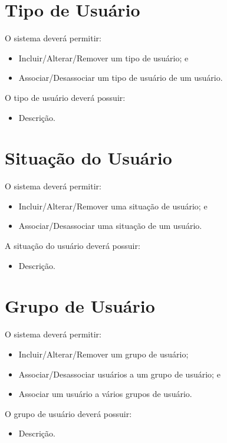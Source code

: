 \section{Tipo de Usuário}

O sistema deverá permitir:

\begin{itemize}
	\item Incluir/Alterar/Remover um tipo de usuário; e
	\item Associar/Desassociar um tipo de usuário de um usuário.
\end{itemize}

O tipo de usuário deverá possuir:

\begin{itemize}
	\item Descrição.
\end{itemize}

\section{Situação do Usuário}

O sistema deverá permitir:

\begin{itemize}
	\item Incluir/Alterar/Remover uma situação de usuário; e
	\item Associar/Desassociar uma situação de um usuário.
\end{itemize}

A situação do usuário deverá possuir:

\begin{itemize}
	\item Descrição.
\end{itemize}

\section{Grupo de Usuário}

O sistema deverá permitir:

\begin{itemize}
	\item Incluir/Alterar/Remover um grupo de usuário;
	\item Associar/Desassociar usuários a um grupo de usuário; e
	\item Associar um usuário a vários grupos de usuário.
\end{itemize}

O grupo de usuário deverá possuir:

\begin{itemize}
	\item Descrição.
\end{itemize}